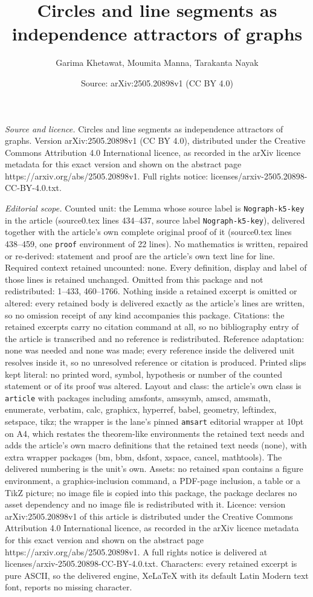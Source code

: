 \documentclass[10pt,a4paper]{amsart}
\title[Circles and line segments as independence attractors of grap]{Circles and line segments as independence attractors of graphs}
\author{Garima Khetawat, Moumita Manna, Tarakanta Nayak}
\date{Source: arXiv:2505.20898v1 (CC BY 4.0)}
\begin{document}
\maketitle

\noindent\emph{Source and licence.} Circles and line segments as independence attractors of graphs. Version arXiv:2505.20898v1 (CC BY 4.0), distributed under the Creative Commons Attribution 4.0 International licence, as recorded in the arXiv licence metadata for this exact version and shown on the abstract page https://arxiv.org/abs/2505.20898v1. Full rights notice: licenses/arxiv-2505.20898-CC-BY-4.0.txt.\par\smallskip

\noindent\textit{Editorial scope.} Counted unit: the Lemma whose source label is \texttt{Nograph-k5-key} in the article (source0.tex lines 434--437, source label \texttt{Nograph-k5-key}), delivered together with the article's own complete original proof of it (source0.tex lines 438--459, one \texttt{proof} environment of 22 lines). No mathematics is written, repaired or re-derived: statement and proof are the article's own text line for line. Required context retained uncounted: none. Every definition, display and label of those lines is retained unchanged. Omitted from this package and not redistributed: 1--433, 460--1766. Nothing inside a retained excerpt is omitted or altered: every retained body is delivered exactly as the article's lines are written, so no omission receipt of any kind accompanies this package. Citations: the retained excerpts carry no citation command at all, so no bibliography entry of the article is transcribed and no reference is redistributed. Reference adaptation: none was needed and none was made; every reference inside the delivered unit resolves inside it, so no unresolved reference or citation is produced. Printed slips kept literal: no printed word, symbol, hypothesis or number of the counted statement or of its proof was altered. Layout and class: the article's own class is \texttt{article} with packages including amsfonts, amssymb, amscd, amsmath, enumerate, verbatim, calc, graphicx, hyperref, babel, geometry, leftindex, setspace, tikz; the wrapper is the lane's pinned \texttt{amsart} editorial wrapper at 10pt on A4, which restates the theorem-like environments the retained text needs and adds the article's own macro definitions that the retained text needs (none), with extra wrapper packages (bm, bbm, dsfont, xspace, cancel, mathtools). The delivered numbering is the unit's own. Assets: no retained span contains a figure environment, a graphics-inclusion command, a PDF-page inclusion, a table or a TikZ picture; no image file is copied into this package, the package declares no asset dependency and no image file is redistributed with it. Licence: version arXiv:2505.20898v1 of this article is distributed under the Creative Commons Attribution 4.0 International licence, as recorded in the arXiv licence metadata for this exact version and shown on the abstract page https://arxiv.org/abs/2505.20898v1. A full rights notice is delivered at licenses/arxiv-2505.20898-CC-BY-4.0.txt. Characters: every retained excerpt is pure ASCII, so the delivered engine, XeLaTeX with its default Latin Modern text font, reports no missing character.
\end{document}
